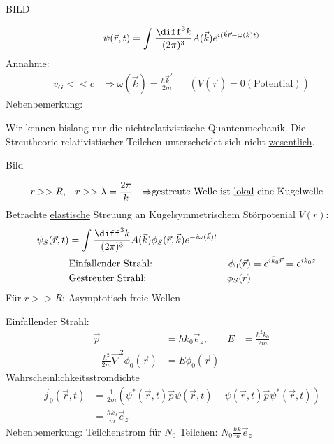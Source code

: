 	BILD
	
		\begin{equation*}
			\psi (\vec{r} , t) = 
			\int \frac{\diff^3 k}{(2 \pi)^3} A(\vec{k}) e^{i(\vec{k} \vec{r} - \omega(\vec{k}) t)}
		\end{equation*}
	Annahme:
		\begin{align*}
			v_G << c &\Rightarrow \omega(\vec{k}) = \frac{\hbar \vec{k}^2}{2 m} & &(V(\vec{r}) = 0 (\text{Potential}))
		\end{align*}
	Nebenbemerkung:
	
	Wir kennen bislang nur die nichtrelativistische Quantenmechanik. Die Streutheorie relativistischer Teilchen unterscheidet sich nicht \underline{wesentlich}.
	
	Bild
	
		\begin{align*}
			r &>> R ,& r &>> \lambda = \frac{2 \pi}{k} &\Rightarrow 
			&\text{gestreute Welle ist \underline{lokal} eine Kugelwelle} 
		\end{align*}
	Betrachte \underline{elastische} Streuung an Kugelsymmetrischem Störpotenial $V(r)$:
		\begin{align*}
			\psi_S (\vec{r}, t) &= 
			\int \frac{\diff^3 k}{(2 \pi)^3} A(\vec{k}) \phi_S (\vec{r}, \vec{k})
			e^{-i \omega (\vec{k}) t} \\
			&\text{Einfallender Strahl:} & \phi_0 (\vec{r}) &= e^{i \vec{k}_0 \vec{r}} = e^{i k_0 z}\\
			&\text{Gestreuter Strahl:} & \phi_S (\vec{r}) 
		\end{align*}
	Für $r >> R$: Asymptotisch freie Wellen
	
	Einfallender Strahl:
		\begin{align*}
			\vec{p} &= \hbar k_0 \vec{e}_z ,& E &= \frac{\hbar^2 k_0}{2 m}\\
			-\frac{\hbar^2}{2 m} \vec{\nabla}^2 \phi_0 (\vec{r}) &= E \phi_0 (\vec{r})
		\end{align*}
	Wahrscheinlichkeitsstromdichte
		\begin{align*}
			\vec{j}_0 (\vec{r}, t) &=
			\frac{1}{2 m} 
			\left(\psi^* (\vec{r} , t) \vec{p} \psi (\vec{r}, t) - \psi (\vec{r}, t) \vec{p} \psi^* (\vec{r}, t)
			\right) \\
			&= \frac{\hbar k_0}{m} \vec{e}_z
		\end{align*}
	Nebenbemerkung: Teilchenstrom für $N_0$ Teilchen: $N_0 \frac{\hbar k}{m} \vec{e}_z$
	
